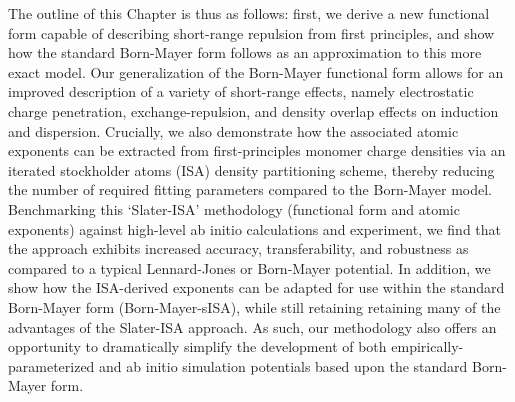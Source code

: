 The outline of this Chapter is thus as follows: first, we derive a new functional form
capable of describing short-range repulsion from first principles, and show how the
standard Born-Mayer form follows as an approximation to this more exact model.
Our generalization of the Born-Mayer functional form allows for an
improved description of a variety of short-range effects,
namely electrostatic charge penetration, exchange-repulsion, and density
overlap effects on induction and dispersion. Crucially, we also demonstrate how the associated
atomic exponents can be extracted from
first-principles monomer charge densities via an iterated stockholder atoms
(ISA) density partitioning scheme, thereby reducing the number of required
fitting parameters compared to the Born-Mayer model.
Benchmarking this `Slater-ISA' methodology (functional form and atomic
exponents) against high-level ab initio
calculations and experiment, we find that the approach exhibits increased
accuracy, transferability, and robustness as compared to a typical
Lennard-Jones or Born-Mayer potential.
In addition, we show how the ISA-derived exponents
can be adapted for use within the standard Born-Mayer form (Born-Mayer-sISA),
while still retaining retaining many of the advantages of the Slater-ISA
approach. As such, our methodology also offers an opportunity to dramatically
simplify the development of both empirically-parameterized and ab initio
simulation potentials based upon the standard Born-Mayer form.
